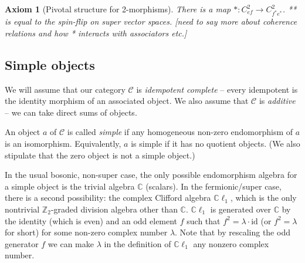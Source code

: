 \documentclass[12pt,a4paper]{article}
\newtheorem{axiom}[theorem]{Axiom}
\newcommand{\cc}{\mathbb{C}}
\newcommand{\mcc}{\mathcal{C}}
\newcommand{\zt}{\mathbb{Z}_2}
\newcommand{\id}{\text{id}}
\newcommand{\End}{\text{End}}
\newcommand{\cl}{\mathbb{C}\ell}
\newcommand{\nn}[1]{{\color{kwcolor}[#1]}}
\begin{document}
\begin{axiom}[Pivotal structure for 2-morphisms]
There is a map $*:C^2_{ef} \to C^2_{f^*e^*}$.
** is equal to the spin-flip on super vector spaces.
\nn{need to say more about coherence relations and how * interacts with associators etc.}
\end{axiom}





\subsection{Simple objects}  \label{def_sob_ss}

We will assume that our category $\mcc$ is {\it idempotent complete} -- 
every idempotent is the identity morphism of an associated object.
We also assume that $\mcc$ is {\it additive} -- we can take direct sums of objects.

An object $a$ of $\mcc$ is called {\it simple} if any homogeneous non-zero endomorphism of $a$ is an isomorphism.
Equivalently, $a$ is simple if it has no quotient objects.
(We also stipulate that the zero object is not a simple object.)

In the usual bosonic, non-super case, the only possible endomorphism algebra for a simple object
is the trivial algebra $\cc$ (scalars).
In the fermionic/super case, there is a second possibility: the complex Clifford algebra $\cl_1$, 
which is the only nontrivial $\zt$-graded division algebra other than $\cc$.
$\cl_1$ is generated over $\cc$ by the identity (which is even) and an odd element $f$ such that $f^2 = \lambda \cdot \id$
(or $f^2 = \lambda$ for short) for some non-zero complex number $\lambda$. 
Note that by rescaling the odd generator $f$ we can make $\lambda$ in the definition of $\cl_1$ any nonzero complex number. 
\end{document}

